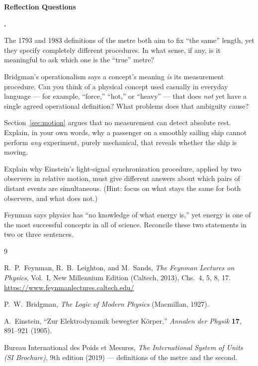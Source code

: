\documentclass[12pt]{book}
\newcounter{reflectq}
\newenvironment{reflectquestions}
  {\begin{list}{\textbf{\arabic{reflectq}.}}
    {\usecounter{reflectq}\setlength{\leftmargin}{1.6em}\setlength{\itemsep}{6pt}}}
  {\end{list}}
\begin{document}
\bigskip
\noindent\textbf{Reflection Questions}
\begin{reflectquestions}
\item The 1793 and 1983 definitions of the metre both aim to fix ``the same'' length, yet they specify completely different procedures. In what sense, if any, is it meaningful to ask which one is the ``true'' metre?
\item Bridgman's operationalism says a concept's meaning \emph{is} its measurement procedure. Can you think of a physical concept used casually in everyday language --- for example, ``force,'' ``hot,'' or ``heavy'' --- that does \emph{not} yet have a single agreed operational definition? What problems does that ambiguity cause?
\item Section~\ref{sec:motion} argues that no measurement can detect absolute rest. Explain, in your own words, why a passenger on a smoothly sailing ship cannot perform \emph{any} experiment, purely mechanical, that reveals whether the ship is moving.
\item Explain why Einstein's light-signal synchronization procedure, applied by two observers in relative motion, must give different answers about which pairs of distant events are simultaneous. (Hint: focus on what stays the same for both observers, and what does not.)
\item Feynman says physics has ``no knowledge of what energy is,'' yet energy is one of the most successful concepts in all of science. Reconcile these two statements in two or three sentences.
\end{reflectquestions}

\bigskip
\begin{thebibliography}{9}

R.~P.~Feynman, R.~B.~Leighton, and M.~Sands,
\emph{The Feynman Lectures on Physics}, Vol.~I, New Millennium Edition (Caltech, 2013), Chs.~4, 5, 8, 17.
\url{https://www.feynmanlectures.caltech.edu/}

P.~W.~Bridgman, \emph{The Logic of Modern Physics} (Macmillan, 1927).

A.~Einstein, ``Zur Elektrodynamik bewegter K\"orper,'' \emph{Annalen der Physik} \textbf{17}, 891--921 (1905).

Bureau International des Poids et Mesures, \emph{The International System of Units (SI Brochure)}, 9th edition (2019) --- definitions of the metre and the second.

\end{thebibliography}
\end{document}
